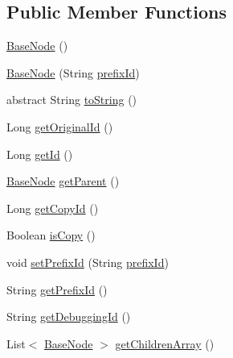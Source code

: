 \subsection*{Public Member Functions}
\begin{DoxyCompactItemize}
\item 
\hyperlink{classit_1_1emarolab_1_1cagg_1_1core_1_1BaseNode_a232a6eb936fff2089b0836709d1e3110}{Base\-Node} ()
\item 
\hyperlink{classit_1_1emarolab_1_1cagg_1_1core_1_1BaseNode_ad5456b3d2d5552aba5c68e6c2baa5713}{Base\-Node} (String \hyperlink{classit_1_1emarolab_1_1cagg_1_1core_1_1BaseNode_a1e4662066a1e580f3ef9a1ad7c483dd8}{prefix\-Id})
\item 
abstract String \hyperlink{classit_1_1emarolab_1_1cagg_1_1core_1_1BaseNode_a4333d02bc1f9764812dc5bffb5af53d2}{to\-String} ()
\item 
Long \hyperlink{classit_1_1emarolab_1_1cagg_1_1core_1_1BaseNode_a60057c324224df3bb3ed19513440dbaa}{get\-Original\-Id} ()
\item 
Long \hyperlink{classit_1_1emarolab_1_1cagg_1_1core_1_1BaseNode_ac2b29704663a2afe6db65bee8b699442}{get\-Id} ()
\item 
\hyperlink{classit_1_1emarolab_1_1cagg_1_1core_1_1BaseNode}{Base\-Node} \hyperlink{classit_1_1emarolab_1_1cagg_1_1core_1_1BaseNode_a4618a493bc87517e3cf9174eaa97bc69}{get\-Parent} ()
\item 
Long \hyperlink{classit_1_1emarolab_1_1cagg_1_1core_1_1BaseNode_ad89da9dcb2927e982f1415ba8ed5fc2b}{get\-Copy\-Id} ()
\item 
Boolean \hyperlink{classit_1_1emarolab_1_1cagg_1_1core_1_1BaseNode_a84ec1522500a0aee620dfe3654a2eb0b}{is\-Copy} ()
\item 
void \hyperlink{classit_1_1emarolab_1_1cagg_1_1core_1_1BaseNode_a6a7f71afc2cc29a45845b75a274c98ef}{set\-Prefix\-Id} (String \hyperlink{classit_1_1emarolab_1_1cagg_1_1core_1_1BaseNode_a1e4662066a1e580f3ef9a1ad7c483dd8}{prefix\-Id})
\item 
String \hyperlink{classit_1_1emarolab_1_1cagg_1_1core_1_1BaseNode_a15d89614a65fa67f3148155f3ef84036}{get\-Prefix\-Id} ()
\item 
String \hyperlink{classit_1_1emarolab_1_1cagg_1_1core_1_1BaseNode_aaa062a29c60d37d63b105a1c95fec6f5}{get\-Debugging\-Id} ()
\item 
List$<$ \hyperlink{classit_1_1emarolab_1_1cagg_1_1core_1_1BaseNode}{Base\-Node} $>$ \hyperlink{classit_1_1emarolab_1_1cagg_1_1core_1_1BaseNode_a24adaab076a6a8a4d9ab0f353182003c}{get\-Children\-Array} ()

\end{DoxyCompactItemize}
